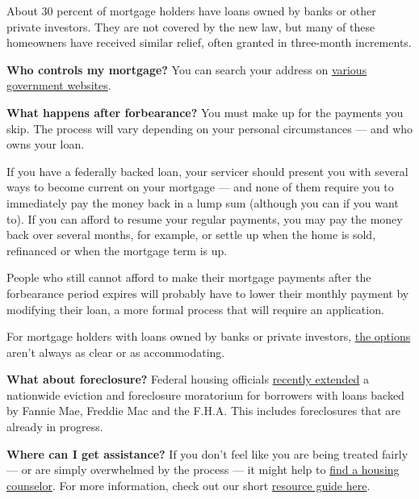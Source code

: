 About 30 percent of mortgage holders have loans owned by banks or other
private investors. They are not covered by the new law, but many of
these homeowners have received similar relief, often granted in
three-month increments.

\textbf{Who controls my mortgage?} You can search your address on
\href{https://www.consumerfinance.gov/ask-cfpb/how-can-i-tell-who-owns-my-mortgage-en-214/}{various}
\href{https://www.makinghomeaffordable.gov/get-answers/Pages/get-answers-find-out-mortgage.aspx}{government
websites}.

\textbf{What happens after forbearance?} You must make up for the
payments you skip. The process will vary depending on your personal
circumstances --- and who owns your loan.

If you have a federally backed loan, your servicer should present you
with several ways to become current on your mortgage --- and none of
them require you to immediately pay the money back in a lump sum
(although you can if you want to). If you can afford to resume your
regular payments, you may pay the money back over several months, for
example, or settle up when the home is sold, refinanced or when the
mortgage term is up.

People who still cannot afford to make their mortgage payments after the
forbearance period expires will probably have to lower their monthly
payment by modifying their loan, a more formal process that will require
an application.

For mortgage holders with loans owned by banks or private investors,
\href{https://www.nytimes3xbfgragh.onion/2020/05/15/business/coronavirus-mortgage-relief.html}{the
options} aren't always as clear or as accommodating.

\textbf{What about foreclosure?} Federal housing officials
\href{https://www.fhfa.gov/Media/PublicAffairs/Pages/FHFA-Extends-Foreclosure-and-Eviction-Moratorium-6172020.aspx}{recently
extended} a nationwide eviction and foreclosure moratorium for borrowers
with loans backed by Fannie Mae, Freddie Mac and the F.H.A. This
includes foreclosures that are already in progress.

\textbf{Where can I get assistance?} If you don't feel like you are
being treated fairly --- or are simply overwhelmed by the process --- it
might help to
\href{https://apps.hud.gov/offices/hsg/sfh/hcc/hcs.cfm}{find a housing
counselor}. For more information, check out our short
\href{https://www.nytimes3xbfgragh.onion/2020/05/15/business/covid-mortgage-forbearance.html}{resource
guide here}.

